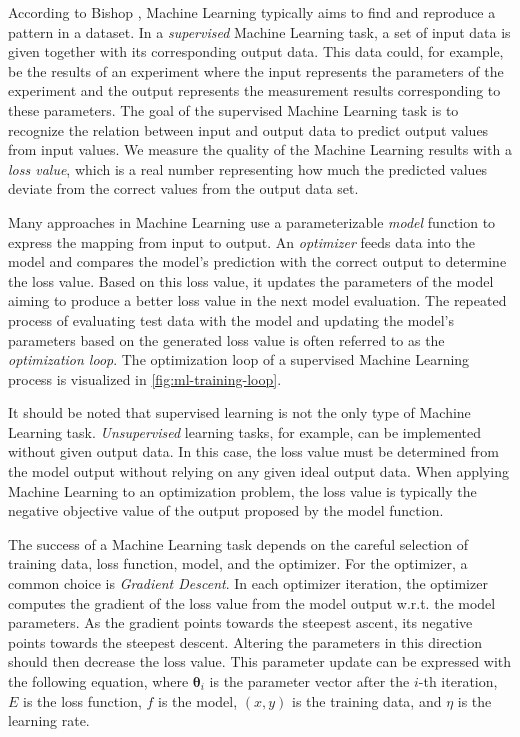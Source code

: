 According to Bishop \cite{bishop_pattern_2006}, Machine Learning typically aims
to find and reproduce a pattern in a dataset.
In a \emph{supervised} Machine Learning task, a set of input data is given
together with its corresponding output data.
This data could, for example, be the results of an experiment where the input
represents the parameters of the experiment and the output represents the
measurement results corresponding to these parameters.
The goal of the supervised Machine Learning task is to recognize the relation
between input and output data to predict output values from input values.
We measure the quality of the Machine Learning results with a
\emph{loss value}, which is a real number representing how much the predicted
values deviate from the correct values from the output data set.

Many approaches in Machine Learning use a parameterizable \emph{model} function
to express the mapping from input to output.
An \emph{optimizer} feeds data into the model and compares the model's
prediction with the correct output to determine the loss value.
Based on this loss value, it updates the parameters of the model aiming to
produce a better loss value in the next model evaluation. 
The repeated process of evaluating test data with the model and updating the
model's parameters based on the generated loss value is often referred to as the
\emph{optimization loop}.
The optimization loop of a supervised Machine Learning process is visualized in
\autoref{fig:ml-training-loop}.

It should be noted that supervised learning is not the only type of
Machine Learning task.
\emph{Unsupervised} learning tasks, for example, can be implemented without
given output data.
In this case, the loss value must be determined from the model output without
relying on any given ideal output data.
When applying Machine Learning to an optimization problem, the loss value is
typically the negative objective value of the output proposed by the model
function.

The success of a Machine Learning task depends on the careful selection of
training data, loss function, model, and the optimizer.
For the optimizer, a common choice is \emph{Gradient Descent}.
In each optimizer iteration, the optimizer computes the gradient of the loss
value from the model output w.r.t. the model parameters.
As the gradient points towards the steepest ascent, its negative points towards
the steepest descent.
Altering the parameters in this direction should then decrease the loss value.
This parameter update can be expressed with the following equation, where
$\mathbf{\theta}_i$ is the parameter vector after the $i$-th iteration, $E$ is
the loss function, $f$ is the model, $(x,y)$ is the training data, and $\eta$ is
the learning rate.

